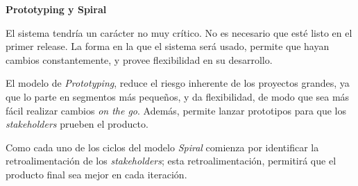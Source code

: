 \textbf{Prototyping y Spiral}

El sistema tendría un carácter no muy crítico. No es necesario que esté listo en el primer release. La forma en la que el sistema será usado, permite que hayan cambios constantemente, y provee flexibilidad en su desarrollo.

El modelo de \textit{Prototyping}, reduce el riesgo inherente de los proyectos grandes, ya que lo parte en segmentos más pequeños, y da flexibilidad, de modo que sea más fácil realizar cambios \textit{on the go}. Además, permite lanzar prototipos para que los \textit{stakeholders} prueben el producto.

Como cada uno de los ciclos del modelo \textit{Spiral} comienza por identificar la retroalimentación de los \textit{stakeholders}; esta retroalimentación, permitirá que el producto final sea mejor en cada iteración.
